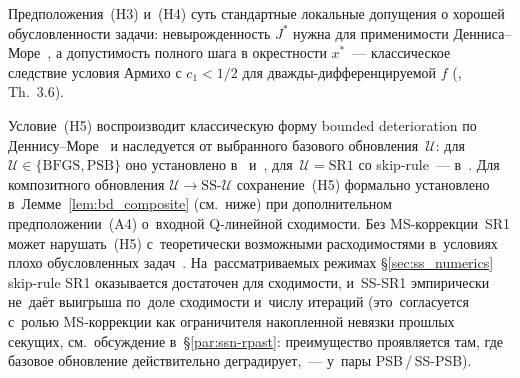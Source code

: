 \begin{remark}\label{rem:ss_dm_assumptions}
Предположения~(H3) и~(H4) суть стандартные локальные допущения о хорошей
обусловленности задачи: невырожденность $J^*$ нужна для применимости
Денниса--Море~\cite{dennis1974}, а допустимость полного шага в окрестности
$x^*$~--- классическое следствие условия Армихо с $c_1 < 1/2$ для
дважды-дифференцируемой $f$ (\cite{bfgs}, Th.~3.6).

Условие~(H5) воспроизводит классическую форму bounded deterioration по
Деннису--Море~\cite[Th.~2.2]{dennis1974} и наследуется от выбранного
базового обновления~$\mathcal{U}$: для $\mathcal{U}\in\{\mathrm{BFGS},
\mathrm{PSB}\}$ оно установлено в~\cite{bfgs} и~\cite[Th.~8.2.4]{dennis1996},
для~$\mathcal{U}=\mathrm{SR1}$ со skip-rule~--- в~\cite{conn1991}.
Для композитного обновления $\mathcal{U}\to\mathrm{SS}\text{-}\mathcal{U}$
сохранение~(H5) формально установлено в~Лемме~\ref{lem:bd_composite}
(см.\ ниже) при дополнительном предположении~(A4) о~входной
Q-линейной сходимости. Без MS-коррекции~SR1 может нарушать~(H5)
с~теоретически возможными расходимостями в~условиях
плохо обусловленных задач~\cite{conn1991}.
На~рассматриваемых режимах §\ref{sec:ss_numerics} skip-rule SR1
оказывается достаточен для сходимости, и~SS-SR1 эмпирически
не~даёт выигрыша по~доле сходимости и~числу итераций (это~согласуется
с~ролью MS-коррекции как ограничителя накопленной невязки прошлых
секущих, см.\ обсуждение в~§\ref{par:ssn-rpast}: преимущество
проявляется там, где базовое обновление действительно деградирует,~---
у~пары PSB\,/\,SS-PSB).
\end{remark}



